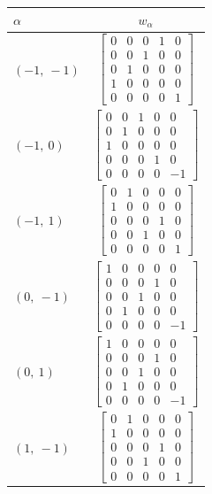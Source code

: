 \documentclass[11pt]{article}
\newcommand{\noi}{\noindent}
\theoremstyle{definition}
\begin{document}
\noi \noindent \begin{longtable}{|l|c|}
    \hline
    $\alpha$ & $w_\alpha$ \\
    \hline
    \endhead
    $\left( -1, \  -1\right)$ & ${\left[\begin{matrix}0 & 0 & 0 & 1 & 0\\0 & 0 & 1 & 0 & 0\\0 & 1 & 0 & 0 & 0\\1 & 0 & 0 & 0 & 0\\0 & 0 & 0 & 0 & 1\end{matrix}\right]}$ \\
    \hline
    $\left( -1, \  0\right)$ & ${\left[\begin{matrix}0 & 0 & 1 & 0 & 0\\0 & 1 & 0 & 0 & 0\\1 & 0 & 0 & 0 & 0\\0 & 0 & 0 & 1 & 0\\0 & 0 & 0 & 0 & -1\end{matrix}\right]}$ \\
    \hline
    $\left( -1, \  1\right)$ & ${\left[\begin{matrix}0 & 1 & 0 & 0 & 0\\1 & 0 & 0 & 0 & 0\\0 & 0 & 0 & 1 & 0\\0 & 0 & 1 & 0 & 0\\0 & 0 & 0 & 0 & 1\end{matrix}\right]}$ \\
    \hline
    $\left( 0, \  -1\right)$ & ${\left[\begin{matrix}1 & 0 & 0 & 0 & 0\\0 & 0 & 0 & 1 & 0\\0 & 0 & 1 & 0 & 0\\0 & 1 & 0 & 0 & 0\\0 & 0 & 0 & 0 & -1\end{matrix}\right]}$ \\
    \hline
    $\left( 0, \  1\right)$ & ${\left[\begin{matrix}1 & 0 & 0 & 0 & 0\\0 & 0 & 0 & 1 & 0\\0 & 0 & 1 & 0 & 0\\0 & 1 & 0 & 0 & 0\\0 & 0 & 0 & 0 & -1\end{matrix}\right]}$ \\
    \hline
    $\left( 1, \  -1\right)$ & ${\left[\begin{matrix}0 & 1 & 0 & 0 & 0\\1 & 0 & 0 & 0 & 0\\0 & 0 & 0 & 1 & 0\\0 & 0 & 1 & 0 & 0\\0 & 0 & 0 & 0 & 1\end{matrix}\right]}$ \\

\end{longtable}
\end{document}
